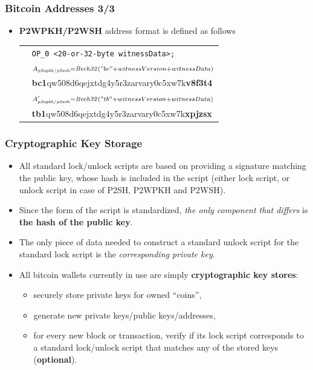 \documentclass{beamer}
\begin{document}
\begin{frame}
  \frametitle{Bitcoin Addresses 3/3}
  \begin{itemize}
  \item \textbf{P2WPKH/P2WSH} address format is defined as follows
    \break
    \begin{tabular}{rl}
      &\tiny\texttt{OP_0 <20-or-32-byte witnessData>;} \\
      &${\scriptstyle A_{\mathit{p2wpkh/p2wsh}} = \mathit{Bech32}("bc" +
        witnessVersion + witnessData)}$ \\
      &{\scriptsize \quad\quad\quad \textbf{bc1}qw508d6qejxtdg4y5r3zarvary0c5xw7k\textbf{v8f3t4}} \\
      &${\scriptstyle A'_{\mathit{p2wpkh/p2wsh}} = \mathit{Bech32}("tb" +
        witnessVersion + witnessData)}$ \\
      &{\scriptsize \quad\quad\quad \textbf{tb1}qw508d6qejxtdg4y5r3zarvary0c5xw7k\textbf{xpjzsx}} \\
    \end{tabular}
  \end{itemize}
\end{frame}

\begin{frame}
  \frametitle{Cryptographic Key Storage}
  \begin{itemize}
  \item All standard lock/unlock scripts are based on providing a signature
    matching the public key, whose hash is included in the script (either lock
    script, or unlock script in case of P2SH, P2WPKH and P2WSH).
  \item Since the form of the script is standardized, \textit{the only component
      that differs} is \textbf{the hash of the public key}.
  \item The only piece of data needed to construct a standard unlock script for
    the standard lock script is the \textit{corresponding private key}.
  \item All bitcoin wallets currently in use are simply \textbf{cryptographic
      key stores}:
    \begin{itemize}
    \item securely store private keys for owned ``coins'',
    \item generate new private keys/public keys/addresses,
    \item for every new block or transaction, verify if its lock script
      corresponds to a standard lock/unlock script that matches any of the
      stored keys (\textbf{optional}).
    \end{itemize}
  \end{itemize}
\end{frame}
\end{document}
